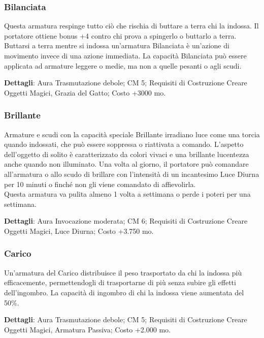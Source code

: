 \begin{multicols}{2}
\subsubsection{Bilanciata}

Questa armatura respinge tutto ciò che rischia di buttare a terra chi la indossa. Il portatore ottiene bonus +4 contro chi prova a spingerlo o buttarlo a terra.\\
Buttarsi a terra mentre si indossa un'armatura Bilanciata è un'azione di movimento invece di una azione immediata. La capacità Bilanciata può essere applicata ad armature leggere o medie, ma non a quelle pesanti o agli scudi.

\textbf{Dettagli}: Aura Trasmutazione debole; CM 5; Requisiti di Costruzione Creare Oggetti Magici, Grazia del Gatto; Costo +3000 mo.

\subsubsection{Brillante}

Armature e scudi con la capacità speciale Brillante irradiano luce come una torcia quando indossati, che può essere soppressa o riattivata a comando. L'aspetto dell'oggetto di solito è caratterizzato da colori vivaci e una brillante lucentezza anche quando non illuminato. Una volta al giorno, il portatore può comandare all'armatura o allo scudo di brillare con l'intensità di un incantesimo Luce Diurna per 10 minuti o finché non gli viene comandato di affievolirla.\\
Questa armatura va pulita almeno 1 volta a settimana o perde i poteri per una settimana.

\textbf{Dettagli}: Aura Invocazione moderata; CM 6; Requisiti di Costruzione Creare Oggetti Magici, Luce Diurna; Costo +3.750 mo.

\subsubsection{Carico}

Un'armatura del Carico distribuisce il peso trasportato da chi la indossa più efficacemente, permettendogli di trasportarne di più senza subire gli effetti dell'ingombro. La capacità di ingombro di chi la indossa viene aumentata del 50\%.

\textbf{Dettagli}: Aura Trasmutazione debole; CM 5; Requisiti di Costruzione Creare Oggetti Magici, Armatura Passiva; Costo +2.000 mo.


\end{multicols}
